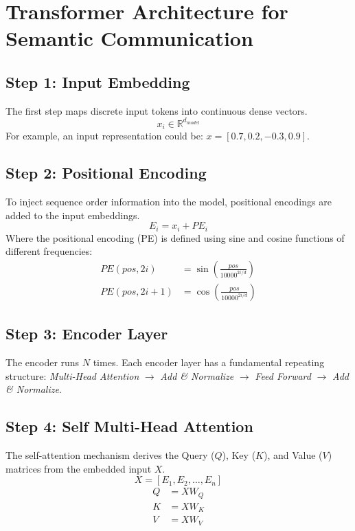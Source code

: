 \documentclass[10pt, conference]{IEEEtran}
\begin{document}
\section{\large \textbf{Transformer Architecture for Semantic Communication}}

\subsection{\textbf{Step 1: Input Embedding}}
The first step maps discrete input tokens into continuous dense vectors.
\begin{equation}
    x_i \in \mathbb{R}^{d_{model}}
\end{equation}
For example, an input representation could be: $x = [0.7, 0.2, -0.3, 0.9]$.

\subsection{\textbf{Step 2: Positional Encoding}}
To inject sequence order information into the model, positional encodings are added to the input embeddings.
\begin{equation}
    E_i = x_i + PE_i
\end{equation}
Where the positional encoding (PE) is defined using sine and cosine functions of different frequencies:
\begin{align}
    PE(pos, 2i) &= \sin\left(\frac{pos}{10000^{2i/d}}\right) \\
    PE(pos, 2i+1) &= \cos\left(\frac{pos}{10000^{2i/d}}\right)
\end{align}

\subsection{\textbf{Step 3: Encoder Layer}}
The encoder runs $N$ times. Each encoder layer has a fundamental repeating structure: 
\textit{Multi-Head Attention} $\rightarrow$ \textit{Add \& Normalize} $\rightarrow$ \textit{Feed Forward} $\rightarrow$ \textit{Add \& Normalize}.

\subsection{\textbf{Step 4: Self Multi-Head Attention}}
The self-attention mechanism derives the Query ($Q$), Key ($K$), and Value ($V$) matrices from the embedded input $X$.
\begin{equation}
    X = [E_1, E_2, \dots, E_n]
\end{equation}
\begin{align}
    Q &= XW_Q \\
    K &= XW_K \\
    V &= XW_V
\end{align}
\end{document}
